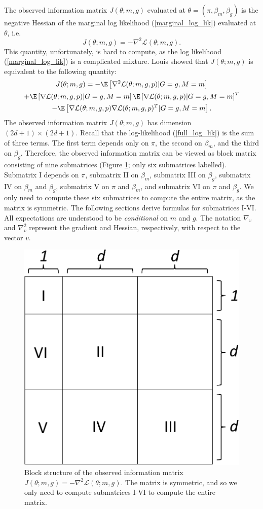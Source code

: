 \documentclass[12pt]{article}
\begin{document}
\begin{appendices}
The observed information matrix $J(\theta; m, g)$ evaluated at $\theta = (\pi, \beta_m, \beta_g)$ is the negative Hessian of the marginal log likelihood (\ref{marginal_log_lik}) evaluated at $\theta$, i.e.
$$J(\theta; m, g) = - \nabla^2\mathcal{L}(\theta; m, g) .$$ This quantity, unfortunately, is hard to compute, as the log likelihood (\ref{marginal_log_lik}) is a complicated mixture. Louis \cite{Louis1982} showed that $J(\theta; m, g)$ is equivalent to the following quantity:
\begin{multline}\label{zero_inf_info_mat}
J(\theta; m, g) = -\E \left[\nabla^2 \mathcal{L}(\theta; m, g, p) | G = g, M = m \right] \\ + \E\left[\nabla \mathcal{L}(\theta; m, g, p) | G = g, M = m \right] \E\left[\nabla \mathcal{L}(\theta; m, g, p) | G = g, M = m \right]^T \\ - \E\left[ \nabla\mathcal{L}(\theta; m, g, p) \nabla \mathcal{L}(\theta; m, g, p)^T | G = g, M = m \right].
\end{multline}
The observed information matrix $J(\theta; m, g)$ has dimension $(2d+1) \times (2d + 1).$ Recall that the log-likelihood (\ref{full_log_lik}) is the sum of three terms. The first term depends only on $\pi$, the second on $\beta_m$, and the third on $\beta_g$. Therefore, the observed information matrix can be viewed as block matrix consisting of nine submatrices (Figure \ref{infomatrixbackground}; only six submatrices labelled). Submatrix I depends on $\pi$, submatrix II on $\beta_m$, submatrix III on $\beta_g$, submatrix IV on $\beta_m$ and $\beta_g$, submatrix V on $\pi$ and $\beta_m$, and submatrix VI on $\pi$ and $\beta_g$. We only need to compute these six submatrices to compute the entire matrix, as the matrix is symmetric. The following sections derive formulas for submatrices I-VI. All expectations are understood to be \textit{conditional} on $m$ and $g$. The notation $\nabla_v$  and $\nabla^2_v$  represent the gradient and Hessian, respectively, with respect to the vector $v$.

\begin{figure}
	\centering
	\includegraphics[width=0.45\linewidth]{../../figures/info_matrix/info_matrix_background}
	\caption{Block structure of the observed information matrix $J(\theta; m, g) = -\nabla^2 \mathcal{L}(\theta; m, g)$. The matrix is symmetric, and so we only need to compute submatrices I-VI to compute the entire matrix.}
	\label{infomatrixbackground}
\end{figure}


\end{appendices}
\end{document}
